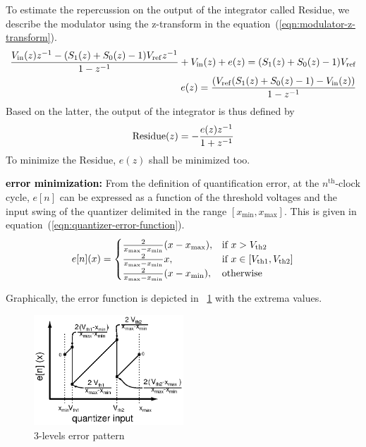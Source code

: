 To estimate the repercussion on the output of the integrator called Residue, we describe the modulator using the z-transform in the equation~(\ref{eqn:modulator-z-transform}).
\begin{eqnarray}
	\label{eqn:modulator-z-transform}
\frac{V_{\rm in}(z)z^{-1}-(S_1(z)+S_0(z)-1)V_{\rm ref}z^{-1}}{1-z^{-1}} + V_{\rm in}(z) + e(z) = (S_1(z)+S_0(z)-1)V_{\rm ref}  \\
e(z) = \frac{(V_{\rm ref}(S_1(z)+S_0(z)-1)-V_{\rm in}(z))}{1-z^{-1}}
\end{eqnarray}
Based on the latter, the output of the integrator is thus defined by
\begin{equation}
	{\rm Residue}(z) = -\frac{e(z)z^{-1}}{1+z^{-1}}
\end{equation}
To minimize the Residue, \(e(z) \) shall be minimized too.

\textbf{\textcolor{black}{error minimization:}}
From the definition of quantification error, at the $n^{\text{th}}$-clock cycle, \(e[n]\) can be expressed as a function of the threshold voltages and the input swing of the quantizer delimited in the range $[x_{\min}, x_{\max}]$. This is given in equation~(\ref{eqn:quantizer-error-function}).
\begin{equation}
	\label{eqn:quantizer-error-function}
	e[n](x) =
\begin{cases}
	\frac{2}{x_{\max}-x_{\min}}(x-x_{\max}),& \text{if } x > V_{\rm th2} \\
	\frac{2}{x_{\max}-x_{\min}}x  ,& \text{if } x \in [V_{\rm th1}, V_{\rm th2}] \\
	\frac{2}{x_{\max}-x_{\min}}(x-x_{\min}),& \text{otherwise}
\end{cases}
\end{equation}

Graphically, the error function is depicted in \figurename~\ref{fig:3-levels-error-pattern} with the extrema values.
\begin{figure}[htp]
	\centering
	\includegraphics[width=0.5\textwidth]{Chapter4/Figs/3-levels-pattern.ps}
	\caption{3-levels error pattern}
	\label{fig:3-levels-error-pattern}
\end{figure}

